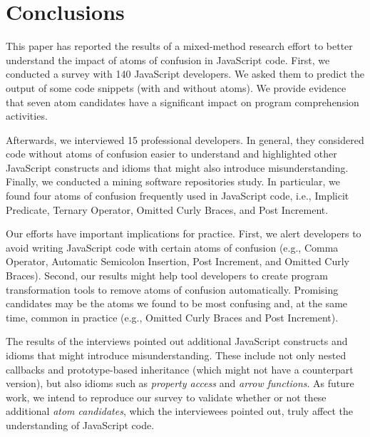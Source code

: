 \section{Conclusions}
\label{conclusion}

This paper has reported the results of a mixed-method research effort to better understand the impact of atoms of confusion in JavaScript code. First, we conducted a survey with 140 JavaScript developers. We asked them to predict the output of some code snippets (with and without atoms). We provide evidence that seven atom candidates have a significant impact on program comprehension activities.

Afterwards, we interviewed 15 professional developers. In general, they considered code without atoms of confusion easier to understand and highlighted other JavaScript constructs and idioms that might also introduce misunderstanding. 
Finally, we conducted a mining software repositories study. In particular, we found four atoms of confusion frequently used in JavaScript code, i.e., Implicit Predicate, Ternary Operator, Omitted Curly Braces, and Post Increment.

Our efforts have important implications for practice. First, we alert developers to avoid writing JavaScript code with certain atoms of confusion (e.g., Comma Operator, Automatic Semicolon Insertion, Post Increment, and Omitted Curly Braces). Second, our results might help tool developers to create program transformation tools to remove atoms of confusion automatically. 
Promising candidates may be the atoms we found to be most confusing and, at the same time, common in practice (e.g., Omitted Curly Braces and Post Increment).

The results of the interviews pointed out additional JavaScript constructs and idioms
that might introduce misunderstanding. These include not only nested callbacks and prototype-based
inheritance (which might not have a counterpart version), but also idioms such
as \emph{property access} and \emph{arrow functions}. As future work, we intend to
reproduce our survey to validate whether or not these additional
\emph{atom candidates}, which the interviewees pointed out, truly affect
the understanding of JavaScript code. 

